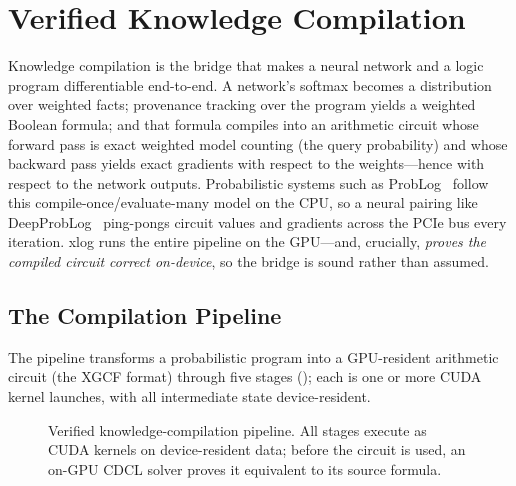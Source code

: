 \section{Verified Knowledge Compilation}\label{sec:prob}

Knowledge compilation is the bridge that makes a neural network and a logic program differentiable end-to-end. A network's softmax becomes a distribution over weighted facts; provenance tracking over the program yields a weighted Boolean formula; and that formula compiles into an arithmetic circuit whose forward pass is exact weighted model counting (the query probability) and whose backward pass yields exact gradients with respect to the weights---hence with respect to the network outputs. Probabilistic systems such as ProbLog~\cite{problog2} follow this compile-once/evaluate-many model on the CPU, so a neural pairing like DeepProbLog~\cite{deepproblog} ping-pongs circuit values and gradients across the PCIe bus every iteration. xlog runs the entire pipeline on the GPU---and, crucially, \emph{proves the compiled circuit correct on-device}, so the bridge is sound rather than assumed.

\subsection{The Compilation Pipeline}

The pipeline transforms a probabilistic program into a GPU-resident arithmetic circuit (the XGCF format) through five stages (); each is one or more CUDA kernel launches, with all intermediate state device-resident.

\begin{figure}[tbp]
  \centering
  \caption{Verified knowledge-compilation pipeline. All stages execute as CUDA kernels on device-resident data; before the circuit is used, an on-GPU CDCL solver proves it equivalent to its source formula.}
  \label{fig:kc}
\end{figure}

